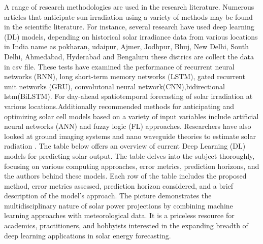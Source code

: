 \documentclass[a4paper,fleqn]{cas-sc}
\begin{document}
A range of research methodologies are used in the research literature. Numerous articles that anticipate sun irradiation using a variety of methods may be found in the scientific literature. For instance, several research have used deep learning (DL) models, depending on historical solar irradiance data from various locations in India name as pokharan, udaipur, Ajmer, Jodhpur, Bhuj, New Delhi, South Delhi, Ahmedabad, Hyderabad and Bengaluru these districs are collect the data in csv file.\cite{kumari2021deep}  These tests have examined the performance of recurrent neural networks (RNN), long short-term memory networks (LSTM), gated recurrent unit networks (GRU), convolutonal neural network(CNN),bidirectional lstm(BiLSTM). For day-ahead spatiotemporal forecasting of solar irradiation at various locations.Additionally recommended methods for anticipating and optimizing solar cell models based on a variety of input variables include artificial neural networks (ANN) and fuzzy logic (FL) approaches.\cite{kumari2021deep} Researchers have also looked at ground imaging systems and nano  waveguide theories to estimate solar radiation .
The table below offers an overview of current Deep Learning (DL) models for predicting solar output. The table delves into the subject thoroughly, focusing on various computing approaches, error metrics, prediction horizons, and the authors behind these models. Each row of the table includes the proposed method, error metrics assessed, prediction horizon considered, and a brief description of the model's approach. The picture demonstrates the multidisciplinary nature of solar power projections by combining machine learning approaches with meteorological data. It is a priceless resource for academics, practitioners, and hobbyists interested in the expanding breadth of deep learning applications in solar energy forecasting.
\end{document}
